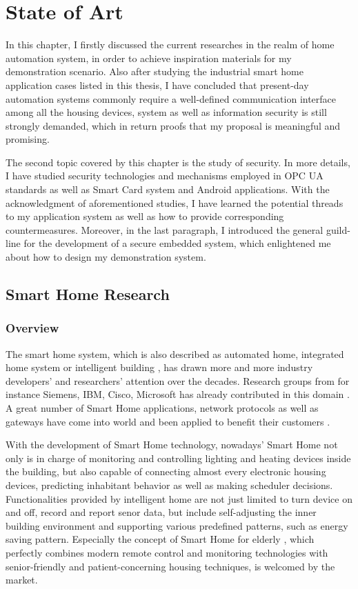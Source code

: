\chapter{State of Art}
In this chapter, I firstly discussed the current researches in the realm of home automation system, in order to achieve inspiration materials for my demonstration scenario. Also after studying the industrial smart home application cases listed in this thesis, I have concluded that present-day automation systems commonly require a well-defined communication interface among all the housing devices, system as well as information security is still strongly demanded, which in return proofs that my proposal is meaningful and promising.  

The second topic covered by this chapter is the study of security. In more details, I have studied security   technologies and mechanisms employed in OPC UA standards as well as Smart Card system and Android applications. With the acknowledgment of aforementioned studies, I have learned the potential threads to my application system as well as how to provide corresponding countermeasures. Moreover, in the last paragraph, I introduced  the general guild-line for the development of a secure embedded system, which enlightened me about how to design my demonstration system.
 
\section{Smart Home Research}
\subsection{Overview}
The smart home system, which is also described as automated home, integrated home system or intelligent building \cite{smart_home_concept}, has drawn more and more industry developers' and researchers' attention over the decades. Research groups from for instance Siemens, IBM, Cisco, Microsoft has already contributed in this domain \cite{smart_home_research}. A great number of Smart Home applications, network protocols as well as gateways have come into world and been applied to benefit their customers \cite{smart_home_for_gateway}.

With the development of Smart Home technology, nowadays' Smart Home not only is in charge of monitoring and controlling lighting and heating devices inside the building, but also capable of connecting almost every electronic housing devices, predicting inhabitant behavior as well as making scheduler decisions. Functionalities provided by intelligent home are not just limited to turn device on and off, record and report senor data, but include self-adjusting the inner building environment and supporting various predefined patterns, such as energy saving pattern. Especially the concept of Smart Home for elderly \cite{smart_home_for_old}, which perfectly combines modern remote control and monitoring technologies with senior-friendly and patient-concerning housing techniques, is welcomed by the market. 

